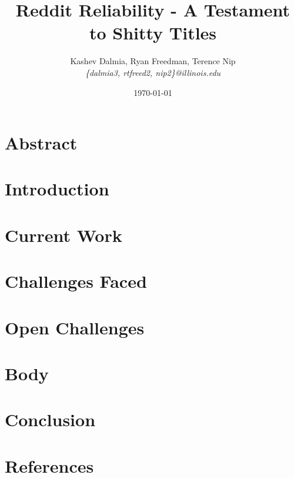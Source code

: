\documentclass[a4paper]{article}
\title{Reddit Reliability - A Testament to Shitty Titles}
\author{Kashev Dalmia, Ryan Freedman, Terence Nip \\
        \textit{\{dalmia3, rtfreed2, nip2\}@illinois.edu}
       }
\date{\today}
\begin{document}
\maketitle

\section{Abstract}
\label{sec:Abstract}



\section{Introduction}
\label{sec:Introduction}


\section{Current Work}
\label{ sec:CurrentWork}


\section{Challenges Faced}
\label{sec:ChallengesFaced}


\section{Open Challenges}
\label{sec:OpenChallenges}


\section{Body} %
\label{sec:Body}


\section{Conclusion}
\label{sec:Conclusion}


\section{References}
\label{sec:References}

\end{document}
